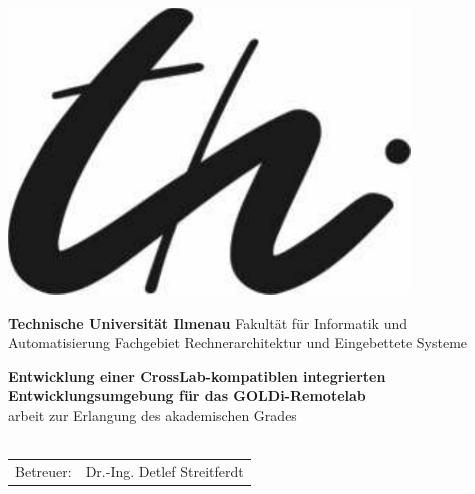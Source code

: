 
\begin{titlepage}
    \hspace{-1cm}
    \begin{minipage}{3.5cm}
        \includegraphics[width=0.8\textwidth]{images/logo}
    \end{minipage}
    \hspace{0.2cm}
    \begin{minipage}{12.5cm}
        \large
        {\bf Technische Universität Ilmenau}\newline
        Fakultät für Informatik und Automatisierung\newline
        Fachgebiet Rechnerarchitektur und Eingebettete Systeme
    \end{minipage}
    \begin{center}
        \vspace{0.8cm}
        {\Large\bfseries Entwicklung einer CrossLab-kompatiblen integrierten Entwicklungsumgebung für das GOLDi-Remotelab\\}
        \vspace{0.8cm}
        \settingsDegree arbeit zur Erlangung des akademischen Grades \settingsDegreeName\\[0.5cm]
        {\Large \bfseries \settingsName\\[1.0cm]}
        \begin{table}[ht]
            \centering
            \begin{tabular}{ll}
                Betreuer: & Dr.-Ing. Detlef Streitferdt                    \\[2mm]

\end{tabular}
\end{table}
\end{center}
\end{titlepage}
